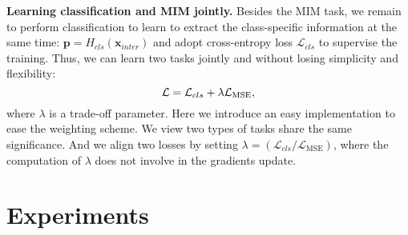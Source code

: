 \documentclass[10pt,twocolumn,letterpaper]{article}
\newcommand{\mypara}[1]{\vspace{1mm}\noindent\textbf{#1}}
\begin{document}
\mypara{Learning classification and MIM jointly.}
Besides the MIM task, we remain to perform classification to learn to extract the class-specific information at the same time:
$\bm{p} = H_{cls}(\bm{x}_{inter})$ and adopt cross-entropy loss $\mathcal{L}_{cls}$ to supervise the training. Thus, we can learn two tasks jointly and without losing simplicity and flexibility:
\vspace{-4pt}
\begin{equation}
  \mathcal{L} =  \mathcal{L}_{cls} + \lambda\mathcal{L}_{\text{MSE}},
  \vspace{-4pt}
  \label{eq:joint}
\end{equation}
where $\lambda$ is a trade-off parameter. Here we introduce an easy implementation to ease the weighting scheme. We view two types of tasks share the same significance.
And we align two losses by setting $\lambda = ({\mathcal{L}_{cls}}/{\mathcal{L}_{\text{MSE}}})$, where the computation of $\lambda$ does not involve in the gradients update. 
\vspace{-4pt} \section{Experiments}
\vspace{-4pt}
\label{sec:exp}
\end{document}
